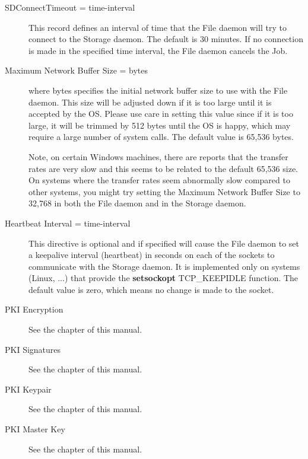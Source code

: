 \begin{description}
\item [SDConnectTimeout = \lt{}time-interval\gt{}]
   This  record defines an interval of time that  the File daemon will try to
   connect to the  Storage daemon. The default is 30 minutes. If no connection 
   is made in the specified time interval, the File daemon  cancels the Job. 

\item [Maximum Network Buffer Size = \lt{}bytes\gt{}]  
   where \lt{}bytes\gt{} specifies the initial network buffer  size to use with
   the File daemon. This size will be adjusted down  if it is too large until it
   is accepted by the OS. Please use  care in setting this value since if it is
   too large, it will  be trimmed by 512 bytes until the OS is happy, which may
   require  a large number of system calls. The default value is 65,536 bytes. 

   Note, on certain Windows machines, there are reports that the
   transfer rates are very slow and this seems to be related to
   the default 65,536 size. On systems where the transfer rates
   seem abnormally slow compared to other systems, you might try
   setting the Maximum Network Buffer Size to 32,768 in both the
   File daemon and in the Storage daemon.

\item [Heartbeat Interval = \lt{}time-interval\gt{}]
   This directive is optional and if specified will cause the File daemon to
   set a keepalive interval (heartbeat) in seconds on each of the sockets
   to communicate with the Storage daemon.  It is implemented only on systems
   (Linux, ...) that provide the {\bf setsockopt} TCP\_KEEPIDLE function.
   The default value is zero, which means no change is made to the socket.


\item [PKI Encryption]
  See the  chapter of this manual. 

\item [PKI Signatures]
  See the  chapter of this manual. 

\item [PKI Keypair]
  See the  chapter of this manual. 

\item [PKI Master Key]
  See the  chapter of this manual. 

\end{description}

